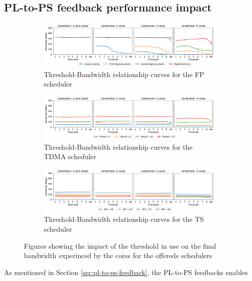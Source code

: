 \subsection{PL-to-PS feedback performance impact}
\label{sec:feedback-pressure}
\begin{figure}[]
  \centering
  \begin{subfigure}{0.9\textwidth}
    \centering
    \includegraphics[scale=0.4]{images/fp.pdf}
    \caption{Threshold-Bandwidth relationship curves for the FP scheduler}
    \label{fig:threshold_fp}
  \end{subfigure}
  \hfill
  \begin{subfigure}{0.9\textwidth}
    \centering
    \includegraphics[scale=0.4]{images/tdma.pdf}
    \caption{Threshold-Bandwidth relationship curves for the TDMA scheduler}
    \label{fig:threshold_tdma}
  \end{subfigure}
  \hfill
  \begin{subfigure}{0.9\textwidth}
    \centering
    \includegraphics[scale=0.4]{images/ts.pdf}
    \caption{Threshold-Bandwidth relationship curves for the TS scheduler}
    \label{fig:threshold_ts}
  \end{subfigure}
  \caption{Figures showing the impact of the threshold in use on the final bandwidth experinced by the cores for the offerede schedulers}
  \label{fig:schim_threshold}
\end{figure}
As mentioned in Section \ref{sec:pl-to-ps-feedback}, the PL-to-PS feedbacks enables
